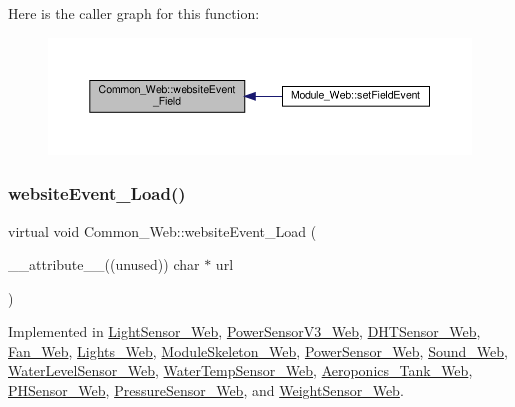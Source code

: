 Here is the caller graph for this function\+:
\nopagebreak
\begin{figure}[H]
\begin{center}
\leavevmode
\includegraphics[width=350pt]{class_common___web_a898e3fd8cc6384ecbbbd79c8a3a13b62_icgraph}
\end{center}
\end{figure}
\mbox{\label{class_common___web_a5ce0d5ce6f63279c3b624371d8a76211}} 
\subsubsection{\texorpdfstring{website\+Event\+\_\+\+Load()}{websiteEvent\_Load()}}
{\footnotesize\ttfamily virtual void Common\+\_\+\+Web\+::website\+Event\+\_\+\+Load (\begin{DoxyParamCaption}\item[{\+\_\+\+\_\+attribute\+\_\+\+\_\+((unused)) char $\ast$}]{url }\end{DoxyParamCaption})\hspace{0.3cm}{\ttfamily [pure virtual]}}



Implemented in \hyperlink{class_light_sensor___web_ac69aec904a72b3c37e9895f6e1d5a848}{Light\+Sensor\+\_\+\+Web}, \hyperlink{class_power_sensor_v3___web_ac5792ce60508b9789927171c6aa10945}{Power\+Sensor\+V3\+\_\+\+Web}, \hyperlink{class_d_h_t_sensor___web_ab28dae39325e2256be5c0c4505149afe}{D\+H\+T\+Sensor\+\_\+\+Web}, \hyperlink{class_fan___web_a3d75cb434fbc0b2885acf73b3a1576c9}{Fan\+\_\+\+Web}, \hyperlink{class_lights___web_afab1fbd6391d25ab5f382b89d4a02b5e}{Lights\+\_\+\+Web}, \hyperlink{class_module_skeleton___web_a391e4cad5fa897f0b57e3992c68eac14}{Module\+Skeleton\+\_\+\+Web}, \hyperlink{class_power_sensor___web_aae5b6cccf5a6eb3877e82e518fd69afa}{Power\+Sensor\+\_\+\+Web}, \hyperlink{class_sound___web_ae3a500bbde7e1264aeeb1bf43b5ba09f}{Sound\+\_\+\+Web}, \hyperlink{class_water_level_sensor___web_af4ed210d015bfc044c0c8398bdf6b21e}{Water\+Level\+Sensor\+\_\+\+Web}, \hyperlink{class_water_temp_sensor___web_a89df0a40b5304ee5dc164bf89a6198e9}{Water\+Temp\+Sensor\+\_\+\+Web}, \hyperlink{class_aeroponics___tank___web_a49ab14d7f9bffac4f4d9adf151589f15}{Aeroponics\+\_\+\+Tank\+\_\+\+Web}, \hyperlink{class_p_h_sensor___web_ad986c8800153e737e43fab3bd155b8af}{P\+H\+Sensor\+\_\+\+Web}, \hyperlink{class_pressure_sensor___web_a235a466d2a93e7f53609c3113871c145}{Pressure\+Sensor\+\_\+\+Web}, and \hyperlink{class_weight_sensor___web_ac0e106b3dbf03e5dd05e35f1f2305eb3}{Weight\+Sensor\+\_\+\+Web}.

